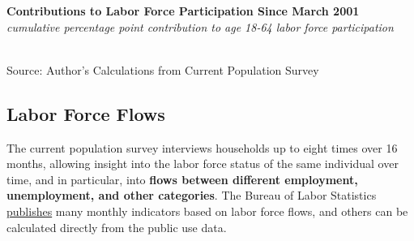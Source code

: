 \documentclass{report}
\makeatletter
\newcommand{\tbllink}[1]{\href{https://raw.githubusercontent.com/bdecon/US-chartbook/master/chartbook/data/#1}{\faTable}}
\newcommand*\short[1]{\expandafter\@gobbletwo\number\numexpr#1\relax}
\newcommand{\stdnode}[3]{\node[below, align=left, shift=({#1,#2})]{#3};}
\newcommand{\dateaxisticks}{
		date coordinates in=x, axis line style={draw=none},
		xmax={2020-05-10},
		max space between ticks=40,	    
		xtick={{1990-01-01}, {1992-01-01}, {1994-01-01}, 
			{1996-01-01}, {1998-01-01}, {2000-01-01}, 
			{2002-01-01}, {2004-01-01}, {2006-01-01},
			{2008-01-01}, {2010-01-01}, {2012-01-01}, {2014-01-01},
		    {2016-01-01}, {2018-01-01}, {2020-01-01}},
		minor xtick={{1989-01-01}, {1991-01-01}, {1993-01-01},
			{1995-01-01}, {1997-01-01}, {1999-01-01}, 
			{2001-01-01}, {2003-01-01}, {2005-01-01}, {2007-01-01},
		    {2009-01-01}, {2011-01-01}, {2013-01-01}, {2015-01-01},
		    {2017-01-01}, {2019-01-01}},
		enlarge y limits={0.06}, enlarge x limits={0.01},
		}
\newcommand{\bbar}[2]{extra #1 ticks = {{#2}}, extra #1 tick labels = ,
		extra #1 tick style = {grid=major, grid style={thick, black!25}},}
\newcommand{\stdline}[4]{\addplot[very thick, no markers, color=#1] 
		table [x=#2, y=#3, col sep=comma] {#4};	}
\newcommand{\thickline}[4]{\addplot[ultra thick, no markers, color=#1] 
		table [x=#2, y=#3, col sep=comma] {#4};	}
\newcommand{\rebars}{
		\fill[color=black!10] (axis cs:{2007-12-01},\pgfkeysvalueof{/pgfplots/ymin}) rectangle 
			(axis cs:{2009-07-01}, \pgfkeysvalueof{/pgfplots/ymax});
		\fill[color=black!10] (axis cs:{2001-03-01},\pgfkeysvalueof{/pgfplots/ymin}) rectangle 
			(axis cs:{2001-11-01}, \pgfkeysvalueof{/pgfplots/ymax});}
\makeatother
\begin{document}
{{{{{{{{{\begin{minipage}{0.76\textwidth}
\noindent \normalsize \textbf{Contributions to Labor Force Participation Since March 2001}\\
\footnotesize{\textit{cumulative percentage point contribution to age 18-64 labor force participation}}\\ 
\noindent \hspace*{-2mm} \\
\footnotesize{Source: Author's Calculations from Current Population Survey} \hspace{16mm} \tbllink{nilf.csv}

\end{minipage}

\newpage


\begin{minipage}{0.76\textwidth}

\subsection*{\color{black!70} \seriffont Labor Force Flows}

\small The current population survey interviews households up to eight times over 16 months, allowing insight into the labor force status of the same individual over time, and in particular, into \textbf{flows between different employment, unemployment, and other categories}. The Bureau of Labor Statistics \href{https://www.bls.gov/cps/cps_flows.htm}{publishes} many monthly indicators based on labor force flows, and others can be calculated directly from the public use data.\\


\end{minipage}}}}}}}}}}
\end{document}
